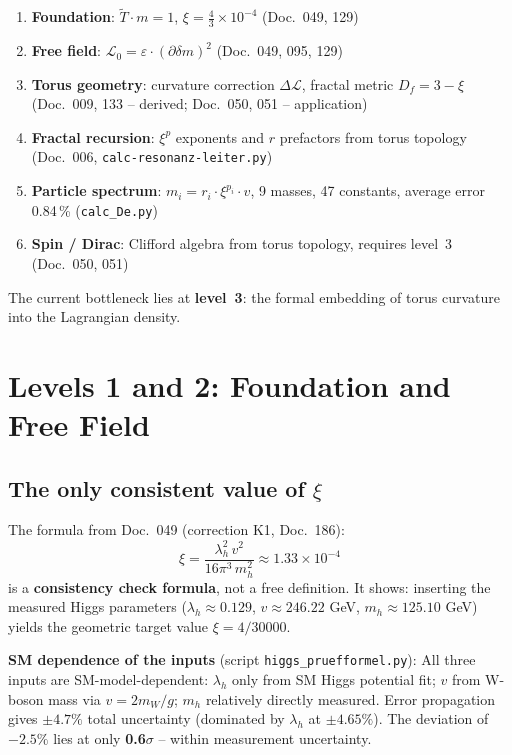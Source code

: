 \begin{enumerate}
    \item \textbf{Foundation}: $\tilde{T} \cdot m = 1$,
          $\xi = \frac{4}{3} \times 10^{-4}$ (Doc.~049, 129)
    \item \textbf{Free field}: $\mathcal{L}_0 = \varepsilon \cdot
          (\partial\delta m)^2$ (Doc.~049, 095, 129)
    \item \textbf{Torus geometry}: curvature correction $\Delta\mathcal{L}$,
          fractal metric $D_f = 3 - \xi$ (Doc.~009, 133 -- derived; Doc.~050, 051 -- application)
    \item \textbf{Fractal recursion}: $\xi^p$ exponents and
          $r$ prefactors from torus topology (Doc.~006,
          \texttt{calc-resonanz-leiter.py})
    \item \textbf{Particle spectrum}: $m_i = r_i \cdot \xi^{p_i} \cdot v$,
          9 masses, 47 constants, average error 0.84\,\%
          (\texttt{calc\_De.py})
    \item \textbf{Spin / Dirac}: Clifford algebra from torus topology,
          requires level~3 (Doc.~050, 051)
\end{enumerate}

The current bottleneck lies at \textbf{level~3}: the formal embedding
of torus curvature into the Lagrangian density.

\section{Levels 1 and 2: Foundation and Free Field}

\subsection{The only consistent value of \texorpdfstring{$\xi$}{xi}}

The formula from Doc.~049 (correction K1, Doc.~186):
\begin{equation}
    \xi = \frac{\lambda_h^2\, v^2}{16\pi^3\, m_h^2}
    \approx 1.33 \times 10^{-4}
    \label{eq:xi_higgs_en}
\end{equation}
is a \textbf{consistency check formula}, not a free definition.
It shows: inserting the measured Higgs parameters
($\lambda_h \approx 0.129$, $v \approx 246.22$ GeV,
$m_h \approx 125.10$ GeV) yields the geometric target value $\xi = 4/30000$.

\textbf{SM dependence of the inputs} (script \texttt{higgs\_pruefformel.py}):
All three inputs are SM-model-dependent: $\lambda_h$ only from SM Higgs
potential fit; $v$ from W-boson mass via $v = 2m_W/g$; $m_h$ relatively
directly measured. Error propagation gives $\pm 4.7\%$ total uncertainty
(dominated by $\lambda_h$ at $\pm 4.65\%$). The deviation of $-2.5\%$
lies at only \textbf{0.6$\sigma$} -- within measurement uncertainty.

